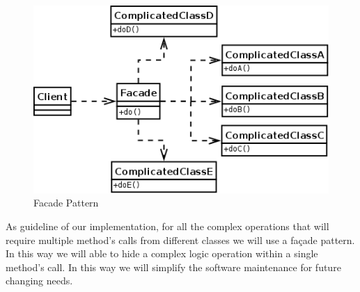 \begin{figure}[H]
	\centering
	\includegraphics[scale=0.3]{Images/Patterns/Facade_Pattern}
	\caption{Facade Pattern}
\end{figure}
As guideline of our implementation, for all the complex operations that will require multiple method’s calls from different classes we will use a façade pattern. In this way we will able to hide a complex logic operation within a single method’s call. In this way we will simplify the software maintenance for future changing needs.
